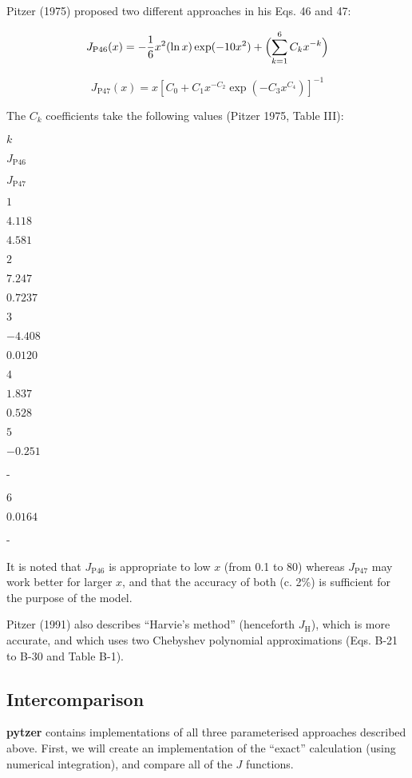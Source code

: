 \documentclass[11pt]{article}
\begin{document}
Pitzer (1975) proposed two different approaches in his Eqs. 46 and 47:

\[ J_{\mathrm{P}46}(x) = -\frac{1}{6}x^2 (\ln{x}) \exp(-10 x^2) + \Bigl( \sum_{k=1}^{6} C_k x^{-k} \Bigr) \]

\[ J_{\mathrm{P}47}(x) = x [C_0 + C_1 x^{-C_2} \exp(-C_3 x^{C_4})]^{-1} \]

The \(C_k\) coefficients take the following values (Pitzer 1975, Table
III):

\(k\)

\(J_{\mathrm{P}46}\)

\(J_{\mathrm{P}47}\)

\(1\)

\(4.118\)

\(4.581\)

\(2\)

\(7.247\)

\(0.7237\)

\(3\)

\(-4.408\)

\(0.0120\)

\(4\)

\(1.837\)

\(0.528\)

\(5\)

\(-0.251\)

-

\(6\)

\(0.0164\)

-

It is noted that \(J_{\mathrm{P}46}\) is appropriate to low \(x\) (from
0.1 to 80) whereas \(J_{\mathrm{P}47}\) may work better for larger
\(x\), and that the accuracy of both (c. 2\%) is sufficient for the
purpose of the model.

Pitzer (1991) also describes ``Harvie's method'' (henceforth
\(J_\mathrm{H}\)), which is more accurate, and which uses two Chebyshev
polynomial approximations (Eqs. B-21 to B-30 and Table B-1).

\hypertarget{intercomparison}{%
\subsection{Intercomparison}\label{intercomparison}}

\textbf{pytzer} contains implementations of all three parameterised
approaches described above. First, we will create an implementation of
the ``exact'' calculation (using numerical integration), and compare all
of the \(J\) functions.
\end{document}
